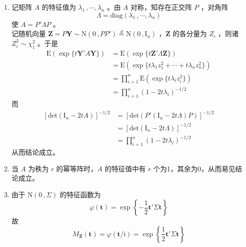 \documentclass[12pt,hyperref,]{ctexart}
\begin{document}
\begin{enumerate}
\def\labelenumi{(\alph{enumi})}
\item
  记矩阵 \(A\) 的特征值为 \(\lambda_1\, ,\cdots ,\lambda_n\) 。由 \(A\)
  对称，知存在正交阵 \(P\) ，对角阵 \begin{equation*}
  \Lambda=\mathrm{diag}(\lambda_1\, ,\cdots ,\lambda_n)
  \end{equation*} 使 \(A=P'\Lambda P\) 。\\
  记随机向量
  \(\boldsymbol{Z}=P\boldsymbol{Y}\sim\mathrm{N}(0\, ,PP')\overset{d}{=}\mathrm{N}(0\, ,\mathrm{I}_n)\)
  ，\(\boldsymbol{Z}\) 的各分量为 \(Z_i\) ，则诸 \(Z_i^2\sim\chi_1^2\)
  。于是 \begin{equation*}
  \begin{aligned}
  \mathrm{E}\left(\exp\{t\boldsymbol{Y}'A\boldsymbol{Y}\}\right) &= \mathrm{E}\left(\exp\{t\boldsymbol{Z}'\Lambda\boldsymbol{Z}\}\right) \\
  &= \mathrm{E}\left(\exp\{t\lambda_1z_1^2+\cdots+t\lambda_nz_n^2\}\right) \\
  &= \prod_{i=1}^n \mathrm{E}\left(\exp\{t\lambda_iz_i^2\}\right) \\
  &= \prod_{i=1}^n (1-2t\lambda_i)^{-1/2}
  \end{aligned}
  \end{equation*}而 \begin{equation*}
  \begin{aligned}
  [\mathrm{det}(\mathrm{I}_n-2tA)]^{-1/2} &= [\mathrm{det}\left(P'(\mathrm{I}_n-2t\Lambda)P\right)]^{-1/2} \\
  &= [\mathrm{det}(\mathrm{I}_n-2t\Lambda)]^{-1/2} \\
  &= \prod_{i=1}^n (1-2t\lambda_i)^{-1/2}
  \end{aligned}
  \end{equation*}从而结论成立。
\item
  当 \(A\) 为秩为 \(r\) 的幂等阵时，\(A\) 的特征值中有 \(r\)
  个为1，其余为0，从而易见结论成立。
\item
  由于 \(\mathrm{N}(0\, ,\Sigma)\) 的特征函数为 \begin{equation*}
  \varphi(\boldsymbol{t})=\exp\left\{-\frac{1}{2}\boldsymbol{t}'\Sigma\boldsymbol{t}\right\}
  \end{equation*}故 \begin{equation*}
  M_{\boldsymbol{Z}}(\boldsymbol{t})=\varphi\left({\boldsymbol{t}}/{\mathrm{i}}\right)=\exp\left\{\frac{1}{2}\boldsymbol{t}'\Sigma\boldsymbol{t}\right\}
  \end{equation*}
\end{enumerate}
\end{document}
